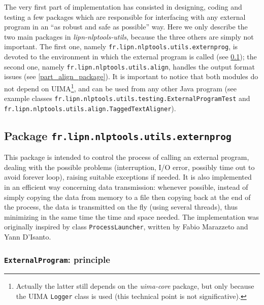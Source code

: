 \documentclass{article}
\newcommand{\packname}{fr.lipn.nlptools}
\newcommand{\utilsPackname}{\packname.utils}
\newcommand{\utilsModule}{{\em lipn-nlptools-utils}\xspace}
\begin{document}
The very first part of implementation has consisted in designing, coding and testing a few packages which are responsible for interfacing with any external program in an ``as robust and safe as possible'' way. Here we only describe the two main packages in \utilsModule, because the three others are simply not important. The first one, namely {\tt \utilsPackname .externprog}, is devoted to the environment in which the external program is called (see \ref{partExternalProgram}); the second one, namely {\tt \utilsPackname .align}, handles the output format issues (see \ref{part_align_package}). It is important to notice that both modules do not depend on UIMA\footnote{Actually the latter still depends on the {\em uima-core} package, but only because the UIMA {\tt Logger} class is used (this technical point is not significative).}, and can be used from any other Java program (see example classes {\tt \utilsPackname .testing.ExternalProgramTest} and {\tt \utilsPackname .align.TaggedTextAligner}).

\subsection{Package {\tt \utilsPackname .externprog}}
\label{partExternalProgram}

This package is intended to control the process of calling an external program, dealing with the possible problems (interruption, I/O error, possibly time out to avoid forever loop), raising suitable exceptions if needed. It is also implemented in an efficient way concerning data transmission: whenever possible, instead of simply copying the data from memory to a file then copying back at the end of the process, the data is transmitted on the fly (using several threads), thus minimizing in the same time the time and space needed. The implementation was originally inspired by class {\tt ProcessLauncher}, written by Fabio Marazzeto and Yann D'Isanto.

\subsubsection{{\tt ExternalProgram}: principle}
\end{document}
